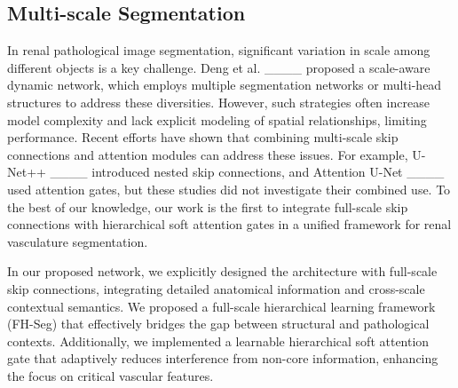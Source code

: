\subsection{Multi-scale Segmentation}
\label{sec:title}
In renal pathological image segmentation, significant variation in scale among different objects is a key challenge. Deng et al. ____ proposed a scale-aware dynamic network, which employs multiple segmentation networks or multi-head structures to address these diversities. However, such strategies often increase model complexity and lack explicit modeling of spatial relationships, limiting performance. Recent efforts have shown that combining multi-scale skip connections and attention modules can address these issues. For example, U-Net++ ____ introduced nested skip connections, and Attention U-Net ____ used attention gates, but these studies did not investigate their combined use. To the best of our knowledge, our work is the first to integrate full-scale skip connections with hierarchical soft attention gates in a unified framework for renal vasculature segmentation.

In our proposed network, we explicitly designed the architecture with full-scale skip connections, integrating detailed anatomical information and cross-scale contextual semantics. We proposed a full-scale hierarchical learning framework (FH-Seg) that effectively bridges the gap between structural and pathological contexts. Additionally, we implemented a learnable hierarchical soft attention gate that adaptively reduces interference from non-core information, enhancing the focus on critical vascular features.


